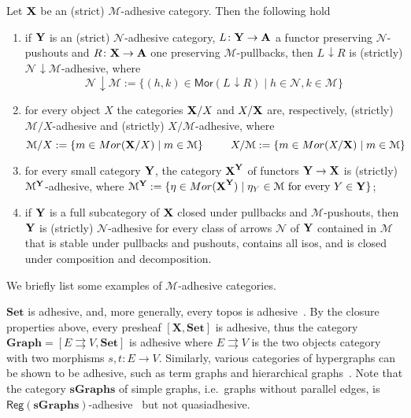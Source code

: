 \documentclass[a4paper,UKenglish,cleveref,pdftex,thm-restate,numberwithinsect]{lipics-v2021}
\newcommand{\cat}[1]{\ensuremath{\mathbf{#1}}}
\def\X{\textbf {\textup{X}}}
\def\Y{\textbf {\textup{Y}}}
\def\A{\textbf {\textup{A}}}
\newcommand{\comma}[2]{#1\hspace{1pt} {\downarrow}#2}
\newcommand{\mor}{\mathsf{Mor}}
\newcommand{\reg}{\mathsf{Reg}}
\begin{document}
\begin{proposition}
	\label{thm:slice-functors}
	Let $\X$ be an (strict) $\mathcal{M}$-adhesive category. Then the following hold
	\begin{enumerate}
		\item if $\Y$ is an (strict) $\mathcal{N}$-adhesive category, $L\colon \Y\to \A$ a functor preserving $\mathcal{N}$-pushouts and $R\colon \X\to \A$ one preserving $\mathcal{M}$-pullbacks, then $\comma{L}{R}$ is (strictly) $\comma{\mathcal{N}}{\mathcal{M}}$-adhesive, where
		\[\comma{\mathcal{N}}{\mathcal{M}}:=\{(h,k) \in \mor(\comma{L}{R}) \mid h\in \mathcal{N}, k\in \mathcal{M}\}\]
		\item for every object $X$
		the categories $\X/X$  and $X/\X$ are, respectively, (strictly) $\mathcal{M}/X$-adhesive and (strictly) $X/\mathcal{M}$-adhesive, where
		\[\mathcal{M}/X:=\{m\in \mor(\X/X) \mid m\in
		\mathcal{M}\} \hspace{25pt} X/\mathcal{M}:=\{m\in \mor(X/\X) \mid m\in \mathcal{M}\}\]
		\item for every small category $\Y$, the category $\X^\Y$ of
		functors $\Y\to \X$ is (strictly) $\mathcal{M}^{\Y}$-adhesive, where
		$\mathcal{M}^{\Y}:=\{\eta \in \mor(\X^\Y) \mid \eta_Y \in
		\mathcal{M} \text{ for every } Y\in \Y\}$;
		\item if $\Y$ is a full subcategory of $\X$ closed under pullbacks and $\mathcal{M}$-pushouts, then $\Y$ is (strictly) $\mathcal{N}$-adhesive for every class of arrows $\mathcal{N}$ of $\Y$ contained in $\mathcal{M}$ that is stable under pullbacks and pushouts, contains all isos, and is closed under composition and decomposition.
	\end{enumerate} 
\end{proposition}

We briefly list some examples of $\mathcal{M}$-adhesive categories.

\begin{example}
	\label{ex:adhesive}
	$\cat{Set}$ is adhesive, and, more generally, every topos is
	adhesive~\cite{lack2006toposes}. By the closure properties above, every presheaf $[\cat{X},\cat{Set}]$ is adhesive, thus the category
	$\cat{Graph} = [ E \rightrightarrows V, \cat{Set}]$ is adhesive
	where $E \rightrightarrows {V}$ is the two objects category with two
	morphisms $s,t \colon{E} \to {V}$. Similarly, various
	categories of hypergraphs can be shown to be adhesive, such as term
	graphs and hierarchical graphs~\cite{CastelnovoGM24}. Note that the category $\cat{sGraphs}$ of simple graphs, 
	i.e.~graphs without parallel edges, is
	$\reg{(\cat{sGraphs})}$-adhesive~\cite{BehrHK23} but not
	quasiadhesive.
\end{example}
\end{document}
